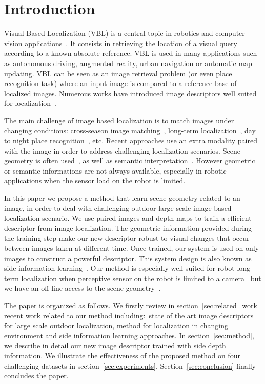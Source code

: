 \section{Introduction}
\label{sec:intro}

Visual-Based Localization (VBL) is a central topic in robotics and computer vision applications~\cite{Piasco2017}. It consists in retrieving the location of a visual query according to a known absolute reference. VBL is used in many applications such as autonomous driving, augmented reality, urban navigation or automatic map updating. VBL can be seen as an image retrieval problem (or even place recognition task) where an input image is compared to a reference base of localized images. Numerous works have introduced image descriptors well suited for localization~\cite{Arandjelovic2017,Kim2017a,Gordo2017,Radenovic2017,Liu2018}. 

The main challenge of image based localization is to match images under changing conditions: cross-season image matching~\cite{Naseer2017a}, long-term localization~\cite{Toft2018}, day to night place recognition~\cite{Torii2015}, etc. Recent approaches use an extra modality paired with the image in order to address challenging localization scenarios. Scene geometry is often used~\cite{Cavallari?,Schonberger2018}, as well as semantic interpretation~\cite{Ardeshir2014,Christie2016,Naseer2017a}. However geometric or semantic informations are not always available, especially in robotic applications when the sensor load on the robot is limited.

In this paper we propose a method that learn scene geometry related to an image, in order to deal with challenging outdoor large-scale image based localization scenario. We use paired images and depth maps to train a efficient descriptor from image localization. The geometric information provided during the training step make our new descriptor robust to visual changes that occur between images taken at different time. Once trained, our system is used on only images to construct a powerful descriptor. This system design is also known as side information learning~\cite{Hoffman2016}. Our method is especially well suited for robot long-term localization when perceptive sensor on the robot is limited to a camera~\cite{Middelberg2014} but we have an off-line access to the scene geometry~\cite{Paparoditis2012,Maddern2016,Wang2016}. 

The paper is organized as follows. We firstly review in section~\ref{sec:related_work} recent work related to our method including:~state of the art image descriptors for large scale outdoor localization, method for localization in changing environment and side information learning approaches. In section~\ref{sec:method}, we describe in detail our new image descriptor trained with side depth information. We illustrate the effectiveness of the proposed method on four challenging datasets in section~\ref{sec:experiments}. Section~\ref{sec:conclusion} finally concludes the paper.